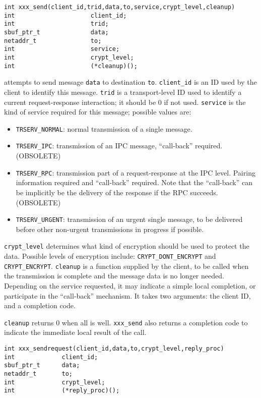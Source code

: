 \begin{verbatim}
int xxx_send(client_id,trid,data,to,service,crypt_level,cleanup)
int                     client_id;
int                     trid;
sbuf_ptr_t              data;
netaddr_t               to;
int                     service;
int                     crypt_level;
int                     (*cleanup)();
\end{verbatim}
attempts to send message \verb"data" to destination \verb"to".
\verb"client_id" is an ID used by the client to identify this message.
\verb"trid" is a transport-level ID used to identify a current
request-response interaction; it should be 0 if not used.
\verb"service" is the kind of service required for this message; possible
values are:
\begin{itemize}
\item \verb"TRSERV_NORMAL": normal transmission of a single message.

\item \verb"TRSERV_IPC": transmission of an IPC message, ``call-back''
required. (OBSOLETE)

\item \verb"TRSERV_RPC": transmission part of a request-response at the IPC
level.  Pairing information required and ``call-back'' required.  Note that
the ``call-back'' can be implicitly be the delivery of the response if the
RPC succeeds. (OBSOLETE)

\item \verb"TRSERV_URGENT": transmission of an urgent single message, to be
delivered before other non-urgent transmissions in progress if possible.
\end{itemize}
\verb"crypt_level" determines what kind of encryption should be used to
protect the data.  Possible levels of encryption include:
\verb"CRYPT_DONT_ENCRYPT" and \verb"CRYPT_ENCRYPT".
\verb"cleanup" is a function supplied by the client, to
be called when the transmission is complete and the message data is no longer
needed.  Depending on the service requested, it may indicate a simple local
completion, or participate in the ``call-back'' mechanism.  It takes two
arguments: the client ID, and a completion code.

\verb"cleanup" returns 0 when all is well.  \verb"xxx_send" also
returns a completion code to indicate the immediate local result of
the call.

\begin{verbatim}
int xxx_sendrequest(client_id,data,to,crypt_level,reply_proc)
int             client_id;
sbuf_ptr_t      data;
netaddr_t       to;
int             crypt_level;
int             (*reply_proc)();
\end{verbatim}

